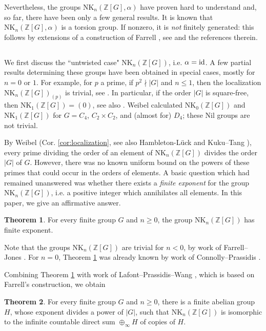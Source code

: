 \documentclass[reqno,11pt,letterpaper]{amsart}
\theoremstyle{plain}
\numberwithin{equation}{subsection}
\newtheorem{theorem}[equation]{Theorem}
\theoremstyle{remark}
\theoremstyle{plain}
\theoremstyle{definition}\newtheorem*{notation}{Notation}
\newtheorem{theorem}{Theorem}
\newcommand{\RNK}{\mathrm{NK}}
\newcommand{\BZ}{\mathbb{Z}}
\begin{document}
 
Nevertheless, the groups  $\RNK_n(\BZ[G], \alpha)$ have proven hard to understand and, so far, there have been only a few general results. It is known that
$ \RNK_n(\BZ[G], \alpha)$ is a torsion group. If nonzero, it is \emph{not} finitely generated: this follows by extensions of a construction of Farrell \cite{Fa},  see \cite{LPW} and the references therein. 

\subsection{}  We first discuss the ``untwisted case" $\RNK_n(\BZ[G])$, i.e. $\alpha={\rm id}$.
A few partial results determining these groups have been obtained in special  cases, mostly for $n=0$ or $1$. For example, for $p$ a prime, if $p^2\nmid |G|$ and $n\leq 1$,  then the localization $\RNK_n(\BZ[G])_{(p)}$ is trivial, see \cite{HLuck}. In particular, if the order $|G|$ is square-free, then $\RNK_1(\BZ[G])=(0)$, see also \cite{Harmon}. Weibel \cite{WNK} calculated $\RNK_0(\BZ[G])$ and $\RNK_1(\BZ[G])$ for  $G=C_4$, $C_2\times C_2$, and (almost for) $D_4$; these Nil groups are not trivial. 
 
By Weibel \cite{WMV} (Cor. \ref{cor:localization}, see also  Hambleton-L\"uck \cite{HLuck} and Kuku--Tang \cite{KukuTang}), 
every prime dividing the order of an element of $\RNK_n(\BZ[G])$ divides the order $|G|$ of $G$. 
However, there was no known uniform bound on the powers of these primes that could occur in the orders of elements. A basic question which had remained unanswered was whether there exists a \emph{finite exponent} for the  group $\RNK_n(\BZ[G])$, i.e. a positive integer which annihilates all  elements. In this paper, we give an affirmative answer. 
 
  
\begin{theorem}\label{ZresultIntro}
For every finite group $G$ and $n\geq 0$, the group $\RNK_{n}(\BZ[G])$ has finite exponent.
\end{theorem}



Note that the groups $\RNK_n(\BZ[G])$ are trivial for $n<0$, by work of Farrell--Jones \cite{FaJo}. For $n=0$, Theorem \ref{ZresultIntro}  was already known by work of Connolly--Prassidis \cite{ConPra}. 

Combining Theorem \ref{ZresultIntro}  with work of Lafont--Prassidis--Wang \cite[Theorem C]{LPW}, which is based on Farrell's construction,  we obtain 


 \begin{theorem}\label{thm:Countable}
For every finite group $G$ and $n\geq 0$, there is a finite abelian group $H$, whose exponent divides a power of  $|G|$, such that 
$\RNK_{n}(\BZ[G])$ is isomorphic to the infinite countable direct sum $ \oplus_\infty H$ of copies of $H$.
\end{theorem}
\end{document}

